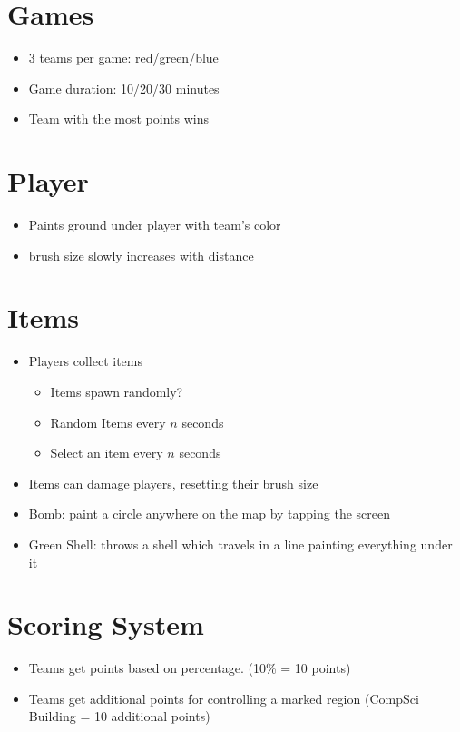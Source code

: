 \documentclass[oneside,12pt]{scrbook}
\begin{document}
\section{Games}
\begin{itemize}
    \item 3 teams per game: red/green/blue
    \item Game duration: 10/20/30 minutes
    \item Team with the most points wins
\end{itemize}

\section{Player}
\begin{itemize}
    \item Paints ground under player with team's color
    \item brush size slowly increases with distance
\end{itemize}

\section{Items}
\begin{itemize}
    \item Players collect items
        \begin{itemize}
            \item Items spawn randomly?
            \item Random Items every $n$ seconds
            \item Select an item every $n$ seconds
        \end{itemize}
    \item Items can damage players, resetting their brush size
    \item Bomb: paint a circle anywhere on the map by tapping the screen
    \item Green Shell: throws a shell which travels in a line painting everything under it
\end{itemize}

\section{Scoring System}
\begin{itemize}
    \item Teams get points based on percentage. (10\% = 10 points)
    \item Teams get additional points for controlling a marked region (CompSci Building = 10 additional points)
\end{itemize}
\end{document}
